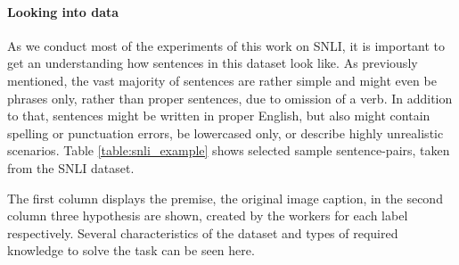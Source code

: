 \paragraph*{Looking into data}
As we conduct most of the experiments of this work on \ac{SNLI}, it is important to get an understanding how sentences in this dataset look like. As previously mentioned, the vast majority of sentences are rather simple and might even be phrases only, rather than proper sentences, due to omission of a verb. In addition to that, sentences might be written in proper English, but also might contain spelling or punctuation errors, be lowercased only, or describe highly unrealistic scenarios.  Table \ref{table:snli_example} shows selected sample sentence-pairs, taken from the \ac{SNLI} dataset.
\begin{center}
\begin{table}[htt]
\begin{center}
\end{center}
\caption{Example sentence pairs, taken from \ac{SNLI}, showing typical sentences within the dataset.}
\label{table:snli_example}
\end{table}
\end{center}
The first column displays the premise, the original image caption, in the second column three hypothesis are shown, created by the workers for each label respectively. Several characteristics of the dataset and types of required knowledge to solve the task can be seen here. 
